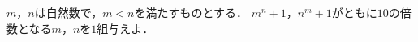 \documentclass[../../main.tex]{subfiles}
\begin{document}
$m$，$n$は自然数で，$m<n$を満たすものとする．
$m^n+1$，$n^m+1$がともに$10$の倍数となる$m$，$n$を$1$組与えよ．
\end{document}
